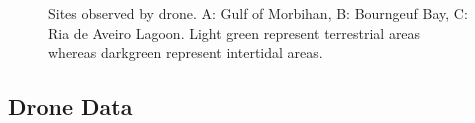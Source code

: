 \documentclass[
  number]{elsarticle}
\begin{document}
\label{cell-fig-map}
\begin{figure}[H]


\caption{\label{fig-map}Sites observed by drone. A: Gulf of Morbihan, B:
Bourngeuf Bay, C: Ria de Aveiro Lagoon. Light green represent
terrestrial areas whereas darkgreen represent intertidal areas.}

\end{figure}%

\subsection{Drone Data}\label{drone-data}
\end{document}
